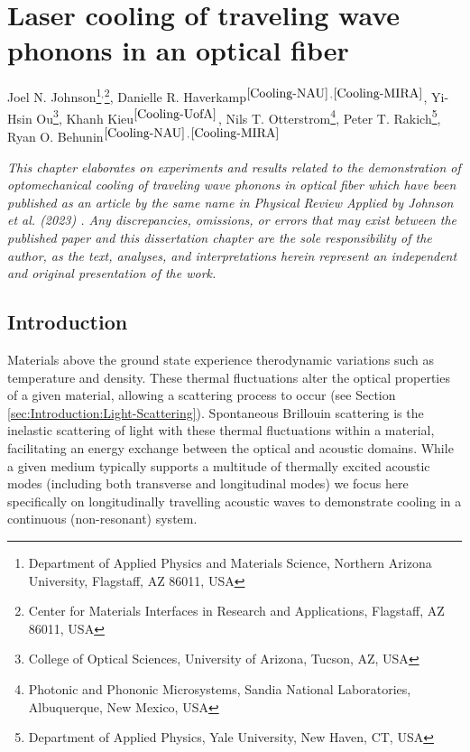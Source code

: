 \setcounter{rownumber}{0}
\chapter{Laser cooling of traveling wave phonons in an optical fiber}
\label{ch:Cooling}
\acresetall

Joel N. Johnson\footnote{\label{Cooling-NAU}
Department of Applied Physics and Materials Science, Northern Arizona University, Flagstaff, AZ 86011, USA
}$^,$\footnote{\label{Cooling-MIRA}
Center for Materials Interfaces in Research and Applications, Flagstaff, AZ 86011, USA
},
Danielle R. Haverkamp$^\mathrm{\ref{Cooling-NAU}}$$^,$$^\mathrm{\ref{Cooling-MIRA}}$,
Yi-Hsin Ou\footnote{\label{Cooling-UofA}
College of Optical Sciences, University of Arizona, Tucson, AZ, USA
},
Khanh Kieu$^\mathrm{\ref{Cooling-UofA}}$,
Nils T. Otterstrom\footnote{\label{Cooling-Sandia}
Photonic and Phononic Microsystems, Sandia National Laboratories, Albuquerque, New Mexico, USA
},
Peter T. Rakich\footnote{\label{Cooling-Yale}
Department of Applied Physics, Yale University, New Haven, CT, USA
},
Ryan O. Behunin$^\mathrm{\ref{Cooling-NAU}}$$^,$$^\mathrm{\ref{Cooling-MIRA}}$

\hfill

\textit{This chapter elaborates on experiments and results related to the demonstration of optomechanical cooling of traveling wave phonons in optical fiber which have been published as an article by the same name in Physical Review Applied by Johnson et al. (2023) \cite{johnson2023laser}. Any discrepancies, omissions, or errors that may exist between the published paper and this dissertation chapter are the sole responsibility of the author, as the text, analyses, and interpretations herein represent an independent and original presentation of the work.}


\section{Introduction}
\label{sec:Cooling:Introduction}

Materials above the ground state experience therodynamic variations such as temperature and density. These thermal fluctuations alter the optical properties of a given material, allowing a scattering process to occur (see Section \ref{sec:Introduction:Light-Scattering}). Spontaneous Brillouin scattering is the inelastic scattering of light with these thermal fluctuations within a material, facilitating an energy exchange between the optical and acoustic domains. While a given medium typically supports a multitude of thermally excited acoustic modes (including both transverse and longitudinal modes) we focus here specifically on longitudinally travelling acoustic waves to demonstrate cooling in a continuous (non-resonant) system.

